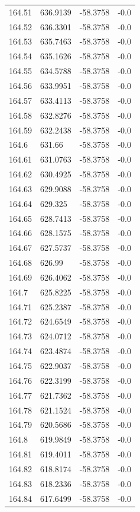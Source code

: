 \begin{table}[H]
\begin{tabular}{llll}
164.51 & 636.9139 & -58.3758 & -0.0 \\
164.52 & 636.3301 & -58.3758 & -0.0 \\
164.53 & 635.7463 & -58.3758 & -0.0 \\
164.54 & 635.1626 & -58.3758 & -0.0 \\
164.55 & 634.5788 & -58.3758 & -0.0 \\
164.56 & 633.9951 & -58.3758 & -0.0 \\
164.57 & 633.4113 & -58.3758 & -0.0 \\
164.58 & 632.8276 & -58.3758 & -0.0 \\
164.59 & 632.2438 & -58.3758 & -0.0 \\
164.6 & 631.66 & -58.3758 & -0.0 \\
164.61 & 631.0763 & -58.3758 & -0.0 \\
164.62 & 630.4925 & -58.3758 & -0.0 \\
164.63 & 629.9088 & -58.3758 & -0.0 \\
164.64 & 629.325 & -58.3758 & -0.0 \\
164.65 & 628.7413 & -58.3758 & -0.0 \\
164.66 & 628.1575 & -58.3758 & -0.0 \\
164.67 & 627.5737 & -58.3758 & -0.0 \\
164.68 & 626.99 & -58.3758 & -0.0 \\
164.69 & 626.4062 & -58.3758 & -0.0 \\
164.7 & 625.8225 & -58.3758 & -0.0 \\
164.71 & 625.2387 & -58.3758 & -0.0 \\
164.72 & 624.6549 & -58.3758 & -0.0 \\
164.73 & 624.0712 & -58.3758 & -0.0 \\
164.74 & 623.4874 & -58.3758 & -0.0 \\
164.75 & 622.9037 & -58.3758 & -0.0 \\
164.76 & 622.3199 & -58.3758 & -0.0 \\
164.77 & 621.7362 & -58.3758 & -0.0 \\
164.78 & 621.1524 & -58.3758 & -0.0 \\
164.79 & 620.5686 & -58.3758 & -0.0 \\
164.8 & 619.9849 & -58.3758 & -0.0 \\
164.81 & 619.4011 & -58.3758 & -0.0 \\
164.82 & 618.8174 & -58.3758 & -0.0 \\
164.83 & 618.2336 & -58.3758 & -0.0 \\
164.84 & 617.6499 & -58.3758 & -0.0 \\

\end{tabular}
\end{table}
